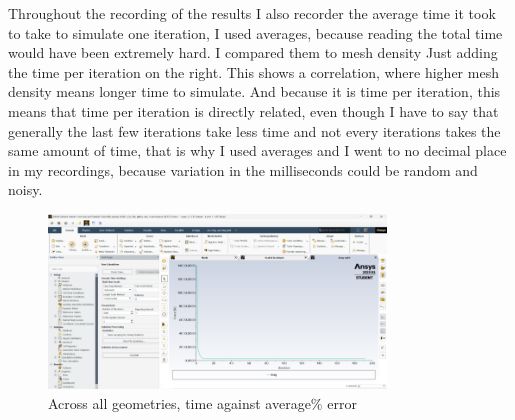 \documentclass[12pt,a4paper]{article}
\begin{document}
\begin{table}[H]
\centering
\caption{All average \% iteration against all \% error and all average mesh elements against average \% error}
\label{tab:final_summary}
\end{table}

Throughout the recording of the results I also recorder the average time it took to take to simulate one iteration, I used averages, because reading the total time would have been extremely hard. I compared them to mesh density 
Just adding the time per iteration on the right. This shows a correlation, where higher mesh density means longer time to simulate.
And because it is time per iteration, this means that time per iteration is directly related, even though I have to say that generally the last few iterations take less time and not every iterations takes the same amount of time, that is why I used averages and I went to no decimal place in my recordings, because variation in the milliseconds could be random and noisy.

\begin{figure}[H]
\centering
\includegraphics[width=0.8\textwidth]{image6.png}
\caption{Across all geometries, time against average\% error}
\label{fig:time_vs_error}
\end{figure}
\end{document}
